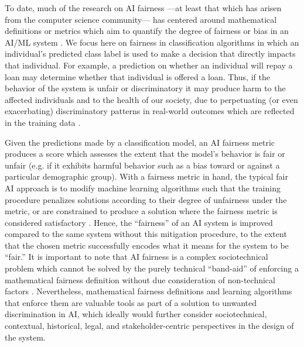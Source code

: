 \documentclass[11pt,dvipdfm]{article}
\begin{document}
To date, much of the research on AI fairness ---at least that which has arisen from the computer science community--- has centered around mathematical definitions or metrics which aim to quantify the degree of fairness or bias in an AI/ML system \cite{dwork2012fairness}.  We focus here on fairness in classification algorithms in which an individual's predicted class label is used to make a decision that directly impacts that individual.  For example, a prediction on whether an individual will repay a loan may determine whether that individual is offered a loan.  Thus, if the behavior of the system is unfair or discriminatory it may produce harm to the affected individuals and to the health of our society, due to perpetuating (or even exacerbating) discriminatory patterns in real-world outcomes which are reflected in the training data \cite{barocas2016big}.

Given the predictions made by a classification model, an AI fairness metric produces a score which assesses the extent that the model's behavior is fair or unfair (e.g. if it exhibits harmful behavior such as a bias toward or against a particular demographic group).  With a fairness metric in hand, the typical fair AI approach is to modify machine learning algorithms such that the training procedure penalizes solutions according to their degree of unfairness under the metric, or are constrained to produce a solution where the fairness metric is considered satisfactory \cite{dwork2012fairness}.  Hence, the ``fairness'' of an AI system is improved compared to the same system without this mitigation procedure, to the extent that the chosen metric successfully encodes what it means for the system to be ``fair.''  It is important to note that AI fairness is a complex sociotechnical problem which cannot be solved by the purely technical ``band-aid'' of enforcing a mathematical fairness definition without due consideration of non-technical factors \cite{crawford2019ai}.  Nevertheless, mathematical fairness definitions and learning algorithms that enforce them are valuable tools as part of a solution to unwanted discrimination in AI, which ideally would further consider sociotechnical, contextual, historical, legal, and stakeholder-centric perspectives in the design of the system.  
\end{document}
